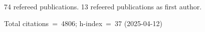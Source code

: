 74 refereed publications. 13 refeered publications as first author.

Total citations~=~4806; h-index~=~37 (2025-04-12)